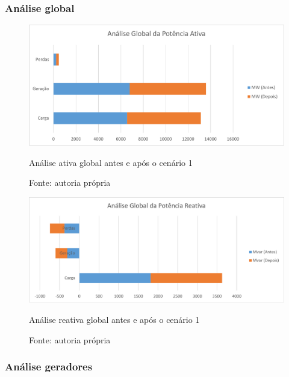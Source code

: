 \subsubsection{Análise global}

\begin{figure}[H]
	\centering
	\captionsetup{width=\textwidth, font=footnotesize, textfont=bf}	
	\includegraphics[width=\linewidth]{img/global_MW_caso1.pdf}
	\caption{Análise ativa global antes e após o cenário 1}
	\vspace{-3.5mm}
	\caption*{Fonte: autoria própria}
	\label{fig:global_MW_caso1}
\end{figure}

\begin{figure}[H]
	\centering
	\captionsetup{width=\textwidth, font=footnotesize, textfont=bf}	
	\includegraphics[width=\linewidth]{img/global_MVAr_caso1.pdf}
	\caption{Análise reativa global antes e após o cenário 1}
	\vspace{-3.5mm}
	\caption*{Fonte: autoria própria}
	\label{fig:global_MVAr_caso1}
\end{figure}
\subsubsection{Análise geradores}

